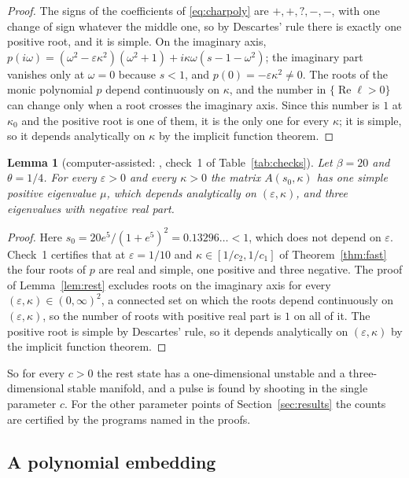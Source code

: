 \documentclass[11pt]{article}
\newtheorem{lemma}{Lemma}[section]
\theoremstyle{definition}
\newcommand{\eps}{\varepsilon}
\newcommand{\re}{\operatorname{Re}}
\begin{document}
\begin{proof}
The signs of the coefficients of \eqref{eq:charpoly} are $+, +, ?, -, -$, with one change of sign whatever the middle one, so by Descartes' rule there is exactly one positive root, and it is simple. On the imaginary axis, $p(i\omega) = (\omega^2 - \eps\kappa^2)(\omega^2 + 1) + i\kappa\omega(s - 1 - \omega^2)$; the imaginary part vanishes only at $\omega = 0$ because $s < 1$, and $p(0) = -\eps\kappa^2 \ne 0$. The roots of the monic polynomial $p$ depend continuously on $\kappa$, and the number in $\{\re\ell > 0\}$ can change only when a root crosses the imaginary axis. Since this number is $1$ at $\kappa_0$ and the positive root is one of them, it is the only one for every $\kappa$; it is simple, so it depends analytically on $\kappa$ by the implicit function theorem.
\end{proof}

\begin{lemma}[computer-assisted: , check~1 of Table~\ref{tab:checks}]\label{lem:count}
Let $\beta = 20$ and $\theta = 1/4$. For every $\eps > 0$ and every $\kappa > 0$ the matrix $A(s_0, \kappa)$ has one simple positive eigenvalue $\mu$, which depends analytically on $(\eps, \kappa)$, and three eigenvalues with negative real part.
\end{lemma}

\begin{proof}
Here $s_0 = 20e^5/(1 + e^5)^2 = 0.13296\ldots < 1$, which does not depend on $\eps$. Check~1 certifies that at $\eps = 1/10$ and $\kappa \in [1/c_2, 1/c_1]$ of Theorem~\ref{thm:fast} the four roots of $p$ are real and simple, one positive and three negative. The proof of Lemma~\ref{lem:rest} excludes roots on the imaginary axis for every $(\eps, \kappa) \in (0, \infty)^2$, a connected set on which the roots depend continuously on $(\eps, \kappa)$, so the number of roots with positive real part is $1$ on all of it. The positive root is simple by Descartes' rule, so it depends analytically on $(\eps, \kappa)$ by the implicit function theorem.
\end{proof}

So for every $c > 0$ the rest state has a one-dimensional unstable and a three-dimensional stable manifold, and a pulse is found by shooting in the single parameter $c$. For the other parameter points of Section~\ref{sec:results} the counts are certified by the programs named in the proofs.

\subsection{A polynomial embedding}\label{sec:embedding}
\end{document}
